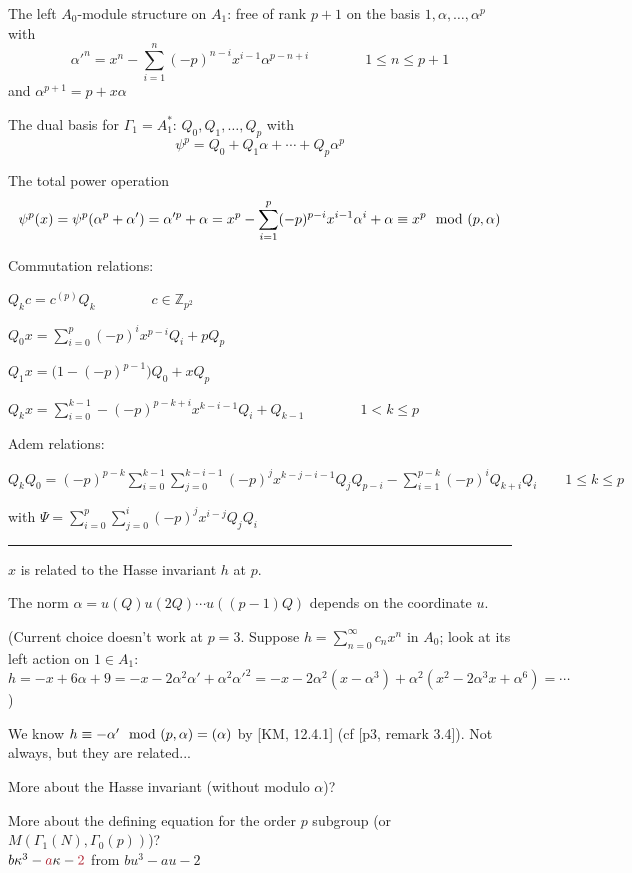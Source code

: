 \documentclass{rs}
\theoremstyle{definition}
\theoremstyle{remark}
\newcommand{\mb}[1]{\mathbb{#1}}
\newcommand{\BZ}{{\mb Z}}
\newcommand{\md}{~~{\rm mod}~}
\newcommand{\A}{\alpha}
\newcommand{\G}{\Gamma}
\newcommand{\K}{\kappa}
\renewcommand{\=}{\approx}
\renewcommand{\-}{\sim}
\numberwithin{equation}{section}
\numberwithin{thm}{section}
\begin{document}
The left $A_0$-module structure on $A_1$: free of rank $p+1$ on the basis $1, \A, \ldots, \A^p$ with 
\[
 \A'^n = x^n - \sum_{i=1}^n (-p)^{n-i} x^{i-1} \A^{p-n+i} \qquad \qquad 1 \leq n \leq p+1 
\]
and $\A^{p+1} = p + x \A$ 

The dual basis for $\G_1 = A_1^*$: $Q_0, Q_1, \ldots, Q_p$ with 
\[
 \psi^p = Q_0 + Q_1 \A + \cdots + Q_p \A^p 
\]

The total power operation 
\[
 \psi^p (x) = \psi^p (\A^p + \A') = \A'^p + \A = x^p - \sum_{i=1}^p (-p)^{p-i} x^{i-1} \A^i + \A \equiv x^p \md (p,\A) 
\]

Commutation relations:

$Q_k c = c^{(p)} Q_k \qquad \qquad c \in \BZ_{p^2}$

$\displaystyle Q_0 x = \sum_{i=0}^p (-p)^i x^{p-i} Q_i + p Q_p$

$Q_1 x = \big( 1- (-p)^{p-1} \big) Q_0 + x Q_p$

$\displaystyle Q_k x = \sum_{i=0}^{k-1} -(-p)^{p-k+i} x^{k-i-1} Q_i + Q_{k-1} \qquad \qquad 1 < k \leq p$

Adem relations:

$\displaystyle Q_k Q_0 = (-p)^{p-k} \sum_{i=0}^{k-1} \sum_{j=0}^{k-i-1} (-p)^j x^{k-j-i-1} Q_j Q_{p-i} - \sum_{i=1}^{p-k} (-p)^i Q_{k+i} Q_i \qquad 1 \leq k \leq p$ 

with $\displaystyle \Psi = \sum_{i=0}^p \sum_{j=0}^i (-p)^j x^{i-j} Q_j Q_i$ \\

\hrule

$x$ is related to the Hasse invariant $h$ at $p$.  

The norm $\A = u(Q) u(2Q) \cdots u((p-1)Q)$ depends on the coordinate $u$.  

(Current choice doesn't work at $p = 3$.  
Suppose $h = \sum_{n=0}^\infty c_n x^n$ in $A_0$; look at its left action on $1 \in A_1$: \\
$h = -x + 6 \A + 9 = -x - 2 \A^2 \A' + \A^2 \A'^2 = -x - 2 \A^2 (x - \A^3) + \A^2 (x^2 - 2 \A^3 x + \A^6) = \cdots$) 

We know $h \equiv -\A' \md (p,\A) = (\A)$ by [KM, 12.4.1] (cf [p3, remark 3.4]).  Not always, but they are related... 

More about the Hasse invariant (without modulo $\A$)?  

More about the defining equation for the order $p$ subgroup (or $M(\G_1(N),\G_0(p))$)?  \\
$b \K^3 - \textcolor{Maroon}{a} \K - \textcolor{Maroon}{2}$ from $b u^3 - a u - 2$ 
\end{document}
